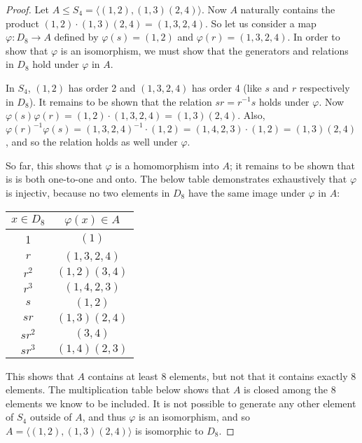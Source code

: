\documentclass{article}
\begin{document}
\begin{proof}
    Let $A \leq S_4 = \langle (1, 2), (1, 3)(2, 4) \rangle$. Now $A$ naturally contains the product $(1, 2) \cdot (1, 3)(2, 4) = (1, 3, 2, 4)$. So let us consider a map $\varphi: D_8 \rightarrow A$ defined by $\varphi(s) = (1, 2)$ and $\varphi(r) = (1, 3, 2, 4)$. In order to show that $\varphi$ is an isomorphism, we must show that the generators and relations in $D_8$ hold under $\varphi$ in $A$.

    In $S_4$, $(1, 2)$ has order 2 and $(1, 3, 2, 4)$ has order 4 (like $s$ and $r$ respectively in $D_8$). It remains to be shown that the relation $sr = r^{-1}s$ holds under $\varphi$. Now $\varphi(s)\varphi(r) = (1, 2) \cdot (1, 3, 2, 4) = (1, 3)(2, 4)$. Also, $\varphi(r)^{-1}\varphi(s) = (1, 3, 2, 4)^{-1} \cdot (1, 2) = (1, 4, 2, 3) \cdot (1, 2) = (1, 3)(2, 4)$, and so the relation holds as well under $\varphi$.

    So far, this shows that $\varphi$ is a homomorphism into $A$; it remains to be shown that is is both one-to-one and onto. The below table demonstrates exhaustively that $\varphi$ is injectiv, because no two elements in $D_8$ have the same image under $\varphi$ in $A$:

    \begin{center}
        \begin{tabular}{ |c|c| } 
            \hline
            $x \in D_8$ & $\varphi(x) \in A$ \\
            \hline
            1 & $(1)$ \\
            \hline
            $r$ & $(1, 3, 2, 4)$ \\
            \hline
            $r^2$ & $(1, 2)(3, 4)$ \\
            \hline
            $r^3$ & $(1, 4, 2, 3)$ \\
            \hline
            $s$ & $(1, 2)$ \\
            \hline
            $sr$ & $(1, 3)(2, 4)$ \\
            \hline
            $sr^2$ & $(3, 4)$ \\
            \hline
            $sr^3$ & $(1, 4)(2, 3)$ \\
            \hline
        \end{tabular}
    \end{center}

    This shows that $A$ contains at least 8 elements, but not that it contains exactly 8 elements. The multiplication table below shows that $A$ is closed among the 8 elements we know to be included. It is not possible to generate any other element of $S_4$ outside of $A$, and thus $\varphi$ is an isomorphism, and so $A = \langle (1, 2), (1, 3)(2, 4) \rangle$ is isomorphic to $D_8$.


\end{proof}
\end{document}
